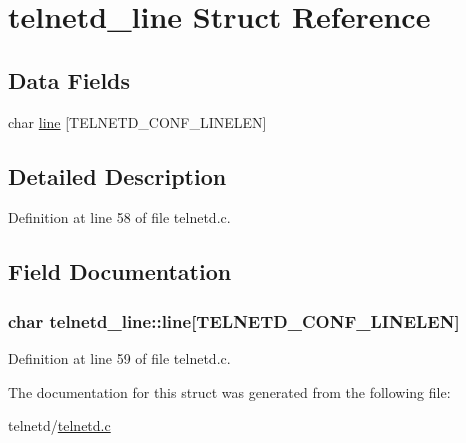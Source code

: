 \hypertarget{structtelnetd__line}{
\section{telnetd\_\-line Struct Reference}
\label{structtelnetd__line}
}
\subsection*{Data Fields}
\begin{DoxyCompactItemize}
\item 
char \hyperlink{structtelnetd__line_a6c7575f1d3d01291ddebd296d769afc8}{line} \mbox{[}TELNETD\_\-CONF\_\-LINELEN\mbox{]}
\end{DoxyCompactItemize}


\subsection{Detailed Description}


Definition at line 58 of file telnetd.c.



\subsection{Field Documentation}
\hypertarget{structtelnetd__line_a6c7575f1d3d01291ddebd296d769afc8}{
\subsubsection[{line}]{\setlength{\rightskip}{0pt plus 5cm}char {\bf telnetd\_\-line::line}\mbox{[}TELNETD\_\-CONF\_\-LINELEN\mbox{]}}}
\label{structtelnetd__line_a6c7575f1d3d01291ddebd296d769afc8}


Definition at line 59 of file telnetd.c.



The documentation for this struct was generated from the following file:\begin{DoxyCompactItemize}
\item 
telnetd/\hyperlink{telnetd_8c}{telnetd.c}\end{DoxyCompactItemize}
